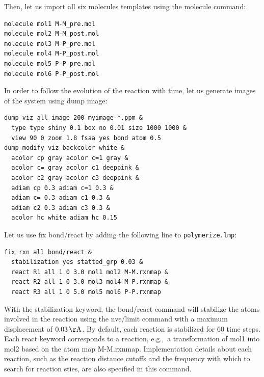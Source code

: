 \documentclass[9pt,tutorial]{livecoms}
\newcommand{\lmpcmd}[1]{\hspace{0pt}\colorbox{listing}{\textcolor{command}{\small{#1}}}\hspace{0pt}} %
\newcommand{\flecmd}[1]{\textcolor{command}{\texttt{#1}}} %
\begin{document}
Then, let us import all six molecules templates using the \lmpcmd{molecule} command:
\begin{lstlisting}
molecule mol1 M-M_pre.mol
molecule mol2 M-M_post.mol
molecule mol3 M-P_pre.mol
molecule mol4 M-P_post.mol
molecule mol5 P-P_pre.mol
molecule mol6 P-P_post.mol
\end{lstlisting}
In order to follow the evolution of the reaction with time, let us generate images
of the system using \lmpcmd{dump image}:
\begin{lstlisting}
dump viz all image 200 myimage-*.ppm &
  type type shiny 0.1 box no 0.01 size 1000 1000 &
  view 90 0 zoom 1.8 fsaa yes bond atom 0.5
dump_modify viz backcolor white &
  acolor cp gray acolor c=1 gray &
  acolor c= gray acolor c1 deeppink &
  acolor c2 gray acolor c3 deeppink &
  adiam cp 0.3 adiam c=1 0.3 &
  adiam c= 0.3 adiam c1 0.3 &
  adiam c2 0.3 adiam c3 0.3 &
  acolor hc white adiam hc 0.15
\end{lstlisting}

Let us use \lmpcmd{fix bond/react} by adding the following
line to \flecmd{polymerize.lmp}:
\begin{lstlisting}
fix rxn all bond/react &
  stabilization yes statted_grp 0.03 &
  react R1 all 1 0 3.0 mol1 mol2 M-M.rxnmap &
  react R2 all 1 0 3.0 mol3 mol4 M-P.rxnmap &
  react R3 all 1 0 5.0 mol5 mol6 P-P.rxnmap
\end{lstlisting}
With the \lmpcmd{stabilization} keyword, the \lmpcmd{bond/react} command will
stabilize the atoms involved in the reaction using the \lmpcmd{nve/limit}
command with a maximum displacement of $0.03\,\mathrm{\AA{}}$.  By default,
each reaction is stabilized for 60 time steps.  Each \lmpcmd{react} keyword
corresponds to a reaction, e.g.,~a transformation of \lmpcmd{mol1} into \lmpcmd{mol2}
based on the atom map \lmpcmd{M-M.rxnmap}.  Implementation details about each reaction,
such as the reaction distance cutoffs and the frequency with which to search for
reaction sties, are also specified in this command.
\end{document}
